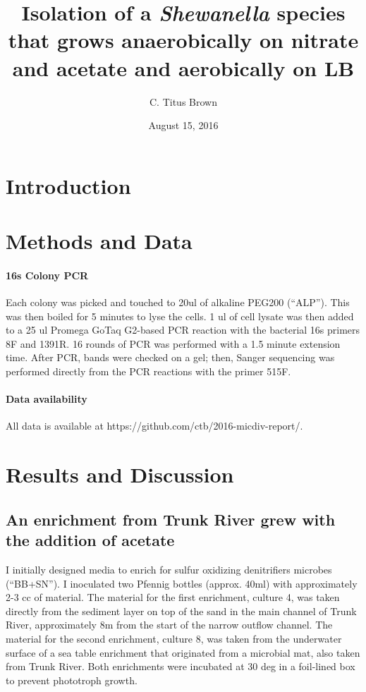 \documentclass{article}
\begin{document}
\title{Isolation of a {\em Shewanella} species that grows
  anaerobically on nitrate and acetate and aerobically on LB}
\author{C. Titus Brown}
\date{August 15, 2016}

\maketitle

\section*{Introduction}

\section*{Methods and Data}

\paragraph{16s Colony PCR} Each colony was picked and touched to 20ul of
alkaline PEG200 (``ALP'').  This was then boiled for 5 minutes to lyse
the cells. 1 ul of cell lysate was then added to a 25 ul Promega GoTaq
G2-based PCR reaction with the bacterial 16s primers 8F and 1391R.  16
rounds of PCR was performed with a 1.5 minute extension time.  After
PCR, bands were checked on a gel; then,
Sanger sequencing was performed directly from the PCR reactions with
the primer 515F.

\paragraph{Data availability}

All data is available at https://github.com/ctb/2016-micdiv-report/.

\section*{Results and Discussion}

\subsection*{An enrichment from Trunk River grew with the addition of acetate}

I initially designed media to enrich for sulfur oxidizing denitrifiers
microbes (``BB+SN'').  I inoculated two Pfennig bottles (approx. 40ml)
with approximately 2-3 cc of material.  The material for the first
enrichment, culture 4, was taken directly from the sediment layer on
top of the sand in the main channel of Trunk River, approximately 8m
from the start of the narrow outflow channel. The material for the
second enrichment, culture 8, was taken from the underwater surface of
a sea table enrichment that originated from a microbial mat, also
taken from Trunk River.  Both enrichments were incubated at 30 deg
in a foil-lined box to prevent phototroph growth.
\end{document}
